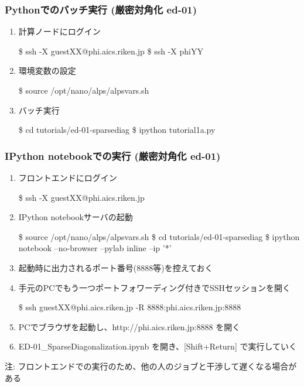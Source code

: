 \begin{frame}[fragile]
  \frametitle{Pythonでのバッチ実行 (厳密対角化 ed-01)}
  \begin{enumerate}
  \item<1-> 計算ノードにログイン
\begin{semiverbatim}
\$ ssh -X guest{\color{red}XX}@phi.aics.riken.jp
\$ ssh -X phi{\color{red}YY}
\end{semiverbatim}
  \item<1-> 環境変数の設定
\begin{semiverbatim}
\$ source /opt/nano/alps/alpsvars.sh
\end{semiverbatim}
  \item<1-> バッチ実行
\begin{semiverbatim}
\$ cd tutorials/ed-01-sparsediag
\$ ipython tutorial1a.py
\end{semiverbatim}
  \end{enumerate}
\end{frame}

\begin{frame}[fragile,shrink=10]
  \frametitle{IPython notebookでの実行 (厳密対角化 ed-01)}
  \begin{enumerate}
  \item<1-> フロントエンドにログイン
\begin{semiverbatim}
\$ ssh -X guest{\color{red}XX}@phi.aics.riken.jp
\end{semiverbatim}
  \item<1-> IPython notebookサーバの起動
\begin{semiverbatim}
\$ source /opt/nano/alps/alpsvars.sh
\$ cd tutorials/ed-01-sparsediag
\$ ipython notebook --no-browser --pylab inline --ip '*'
\end{semiverbatim}
  \item<1-> 起動時に出力されるポート番号(8888等)を控えておく
  \item<1-> 手元のPCでもう一つポートフォワーディング付きでSSHセッションを開く
\begin{semiverbatim}
\$ ssh guest{\color{red}XX}@phi.aics.riken.jp -R 8888:phi.aics.riken.jp:8888
\end{semiverbatim}
  \item<1-> PCでブラウザを起動し、http://phi.aics.riken.jp:8888 を開く
  \item<1-> ED-01\_SparseDiagonalization.ipynb を開き、[Shift+Return] で実行していく
  \end{enumerate}
  注: フロントエンドでの実行のため、他の人のジョブと干渉して遅くなる場合がある
\end{frame}

